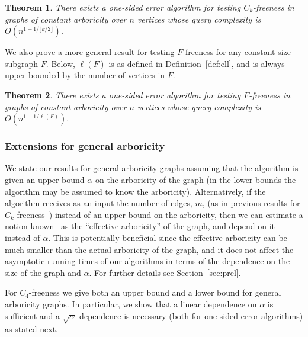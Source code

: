 \documentclass{article}
\newtheorem{theorem}{Theorem}
\newcommand{\commentt}[1]{ {}}
\newcommand{\SodaReb}[1]{{ #1}}
\begin{document}
\begin{theorem}\label{thm:Ck-ub-intro}
There exists a one-sided error algorithm for testing $C_k$-freeness in graphs of constant arboricity over $n$ vertices whose query complexity %
is $O(n^{1-1/\lfloor k/2 \rfloor })$. 
\end{theorem}

\SodaReb{
We also prove a more general result for testing $F$-freeness for any constant size subgraph $F$. Below, $\ell(F)$ is as defined in Definition~\ref{def:ell}, and is always upper bounded by the number of vertices in $F$.}


\begin{theorem}\label{thm:Gen-F-ub-intro}
\SodaReb{There exists  a one-sided error algorithm for testing  $F$-freeness in graphs of constant arboricity over $n$ vertices whose query complexity is $O(n^{1-1/\ell(F)}).$}
\end{theorem}



 \subsubsection{Extensions for general arboricity}


We state our results for general arboricity graphs assuming that the algorithm is given an 
upper bound $\alpha$ on the arboricity of the graph (in  the lower bounds the algorithm may be assumed to know the arboricity).
Alternatively,
if the algorithm receives as an input the number of edges, $m$, (as in previous results for $C_k$-freeness~\cite{AKKR08, Reut}) instead of an upper bound on the arboricity, then we can estimate a notion known~\cite{Reut} as the ``effective arboricity'' of the graph, and depend on it instead of $\alpha$. This is potentially beneficial since the effective arboricity can be much smaller than the actual arboricity of the graph, \SodaReb{and it does not affect the asymptotic running times of our algorithms in terms of the dependence on the size of the graph and $\alpha$}. For further details see Section~\ref{sec:prel}.

For $C_4$-freeness we give both an upper bound and a lower bound for general arboricity graphs. In particular, we show that a linear dependence on $\alpha$ is sufficient and a $\sqrt{\alpha}$-dependence is necessary (both for one-sided error algorithms) as stated next.
\end{document}
